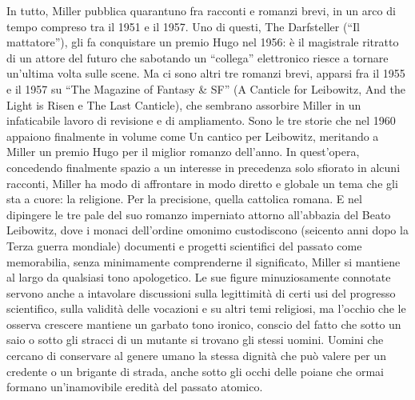In tutto, Miller pubblica quarantuno fra racconti e romanzi brevi, in un arco di tempo compreso tra il 1951 e il 1957. Uno di questi, The Darfsteller (“Il mattatore”), gli fa conquistare un premio Hugo nel 1956: è il magistrale ritratto di un attore del futuro che sabotando un “collega” elettronico riesce a tornare un'ultima volta sulle scene. Ma ci sono altri tre romanzi brevi, apparsi fra il 1955 e il 1957 su “The Magazine of Fantasy \& SF” (A Canticle for Leibowitz, And the Light is Risen e The Last Canticle), che sembrano assorbire Miller in un infaticabile lavoro di revisione e di ampliamento. Sono le tre storie che nel 1960 appaiono finalmente in volume come Un cantico per Leibowitz, meritando a Miller un premio Hugo per il miglior romanzo dell'anno. In quest'opera, concedendo finalmente spazio a un interesse in precedenza solo sfiorato in alcuni racconti, Miller ha modo di affrontare in modo diretto e globale un tema che gli sta a cuore: la religione. Per la precisione, quella cattolica romana. E nel dipingere le tre pale del suo romanzo imperniato attorno all'abbazia del Beato Leibowitz, dove i monaci dell'ordine omonimo custodiscono (seicento anni dopo la Terza guerra mondiale) documenti e progetti scientifici del passato come memorabilia, senza minimamente comprenderne il significato, Miller si mantiene al largo da qualsiasi tono apologetico. Le sue figure minuziosamente connotate servono anche a intavolare discussioni sulla legittimità di certi usi del progresso scientifico, sulla validità delle vocazioni e su altri temi religiosi, ma l'occhio che le osserva crescere mantiene un garbato tono ironico, conscio del fatto che sotto un saio o sotto gli stracci di un mutante si trovano gli stessi uomini. Uomini che cercano di conservare al genere umano la stessa dignità che può valere per un credente o un brigante di strada, anche sotto gli occhi delle poiane che ormai formano un'inamovibile eredità del passato atomico.

